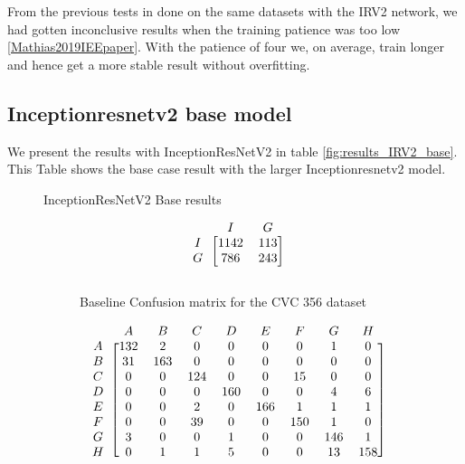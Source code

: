 From the previous tests in done on the same datasets with the IRV2 network, we had gotten inconclusive results when the training patience was too low \ref{Mathias2019IEEpaper}. With the patience of four we, on average, train longer and hence get a more stable result without overfitting.

\subsection{Inceptionresnetv2 base model}

We present the results with InceptionResNetV2 in table \ref{fig:results_IRV2_base}.
This Table shows the base case result with the larger Inceptionresnetv2 model. 

\begin{figure}[h]
\caption{InceptionResNetV2 Base results}
\myfontsize
\caption*{\footnotesize \textmd{ \textbf{A}:{dyed-lifted-polyps} , \textbf{B}:{dyed-resection-margins} , \textbf{C}:{esophagitis} , \textbf{D}:{normal-cecum} , \textbf{E}:{normal-pylorus} , \textbf{F}:{normal-z-line} , \textbf{G}:{polyps} , \textbf{H}:{ulcerative-colitis} , \textbf{I}:{non-polyp}}}

\begin{subfigure}[b]{0.25\textwidth}
     
\[
\begin{blockarray}{ccc}
& I & G  \\
\begin{block}{c[cc]}
        I&1142 &  113\\
        G& 786 &  243\\
\end{block}
\end{blockarray}
 \]         

\caption{Baseline Confusion matrix for the CVC 356 dataset}
\label{mat:cvc356_CM_IRV2_base}
\end{subfigure}
\begin{subfigure}[b]{0.49\textwidth}  
\scriptsize     
\[
\begin{blockarray}{ccccccccc}
& A & B & C & D & E & F & G & H \\
\begin{block}{c[cccccccc]}
A&132 & 2 & 0 & 0 & 0 & 0 & 1 & 0\\
B& 31 & 163 & 0 & 0 & 0 & 0 & 0 & 0\\
C&  0 & 0 & 124 & 0 & 0 & 15 & 0 & 0\\
D&  0 & 0 & 0 & 160 & 0 & 0 & 4 & 6\\
E&  0 & 0 & 2 & 0 & 166 & 1 & 1 & 1\\
F&  0 & 0 & 39 & 0 & 0 & 150 & 1 & 0\\
G&  3 & 0 & 0 & 1 & 0 & 0 & 146 & 1\\
H&  0 & 1 & 1 & 5 & 0 & 0 & 13 & 158\\
\end{block}
\end{blockarray}
 \]        
        

\end{subfigure}
\end{figure}
